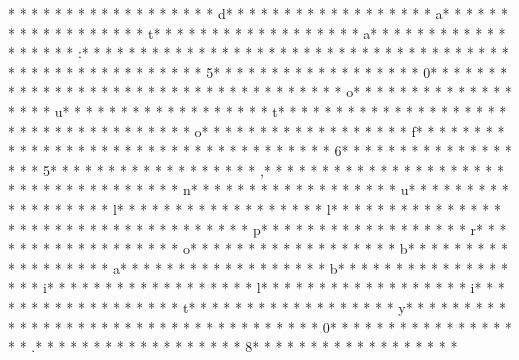 * * *  * * *  * * *  *  * * *  *  * * *  * d* * *  * * *  * * *  *  * * *  *  * * *  * a* * *  * * *  * * *  *  * * *  *  * * *  * t* * *  * * *  * * *  *  * * *  *  * * *  * a* * *  * * *  * * *  *  * * *  *  * * *  * :* * *  * * *  * * *  *  * * *  *  * * *  *  * * *  * * *  * * *  *  * * *  *  * * *  *  * * *  * * *  * * *  *  * * *  *  * * *  * 5* * *  * * *  * * *  *  * * *  *  * * *  * 0* * *  * * *  * * *  *  * * *  *  * * *  *  * * *  * * *  * * *  *  * * *  *  * * *  * o* * *  * * *  * * *  *  * * *  *  * * *  * u* * *  * * *  * * *  *  * * *  *  * * *  * t* * *  * * *  * * *  *  * * *  *  * * *  *  * * *  * * *  * * *  *  * * *  *  * * *  * o* * *  * * *  * * *  *  * * *  *  * * *  * f* * *  * * *  * * *  *  * * *  *  * * *  *  * * *  * * *  * * *  *  * * *  *  * * *  * 6* * *  * * *  * * *  *  * * *  *  * * *  * 5* * *  * * *  * * *  *  * * *  *  * * *  * ,* * *  * * *  * * *  *  * * *  *  * * *  *  * * *  * * *  * * *  *  * * *  *  * * *  * n* * *  * * *  * * *  *  * * *  *  * * *  * u* * *  * * *  * * *  *  * * *  *  * * *  * l* * *  * * *  * * *  *  * * *  *  * * *  * l* * *  * * *  * * *  *  * * *  *  * * *  *  * * *  * * *  * * *  *  * * *  *  * * *  * p* * *  * * *  * * *  *  * * *  *  * * *  * r* * *  * * *  * * *  *  * * *  *  * * *  * o* * *  * * *  * * *  *  * * *  *  * * *  * b* * *  * * *  * * *  *  * * *  *  * * *  * a* * *  * * *  * * *  *  * * *  *  * * *  * b* * *  * * *  * * *  *  * * *  *  * * *  * i* * *  * * *  * * *  *  * * *  *  * * *  * l* * *  * * *  * * *  *  * * *  *  * * *  * i* * *  * * *  * * *  *  * * *  *  * * *  * t* * *  * * *  * * *  *  * * *  *  * * *  * y* * *  * * *  * * *  *  * * *  *  * * *  *  * * *  * * *  * * *  *  * * *  *  * * *  * 0* * *  * * *  * * *  *  * * *  *  * * *  * .* * *  * * *  * * *  *  * * *  *  * * *  * 8* * *  * * *  * * *  *  * * *  *  * * *  * 
